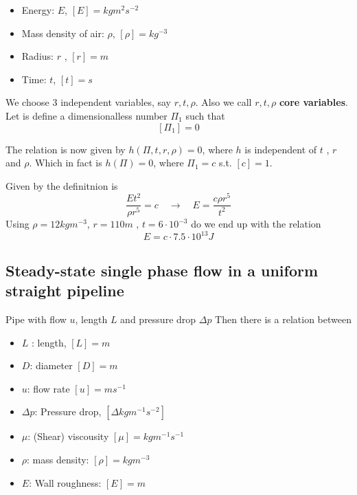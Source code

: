\documentclass{article}
\theoremstyle{remark}
\begin{document}
\begin{itemize}
  \item Energy: $E$, $\left[ E \right] = kg m^2 s^{-2}$ 
  \item Mass density of air: $\rho$, $\left[ \rho \right] = kg ^{-3}$
  \item Radius: $r$ , $\left[ r \right] = m$
  \item Time: $t$, $\left[ t \right] =s$ 
\end{itemize}

We choose 3 independent variables, say $r, t, \rho$. Also we call $r, t, \rho  $ \textbf{core variables}.  Let is define a dimensionalless number $\Pi_{1} $ such that \[
\left[ \Pi _{1} \right] = 0
\] 

The relation is now given by $h\left( \Pi , t, r, \rho \right) = 0$, where $h$ is independent of $t$ , $r$ and $\rho$. Which in fact is $h\left( \Pi  \right) = 0$, where $\Pi _{1} = c$ s.t. $\left[ c \right] = 1$.  
\par
Given by the definitnion is \[
\frac{E t^{2}}{\rho r ^{5}} = c \quad  \to \quad  E = \frac{c \rho r^{5}}{t^{2}}  
\] 
Using $\rho = 12 kgm^{-3}$, $r = 110m$ , $t = 6 \cdot 10^{-3}$ do we end up with the relation \[
E = c \cdot  7.5 \cdot  10 ^{13} J
\] 

\subsection{Steady-state single phase flow in a uniform straight pipeline}%
\label{sub:steady_state_single_phase_flow}

Pipe with flow $u$, length $L$ and pressure drop $\Delta p$ Then there is a relation between 
\begin{itemize}
  \item $L$ : length, $\left[ L \right] = m$ 
  \item $D$: diameter $\left[ D \right] = m$
  \item $u$: flow rate $\left[ u \right] = ms^{-1}$
  \item $\Delta p$: Pressure drop, $\left[ \Delta kg m^{-1} s^{-2} \right]$
  \item $\mu$: (Shear) viscousity $\left[ \mu \right] = kg m^{-1} s^{-1}$ 
  \item $\rho$: mass density: $\left[ \rho \right] = kg m^{-3}$
  \item $E$: Wall roughness: $\left[ E \right] = m$
\end{itemize}
\end{document}
